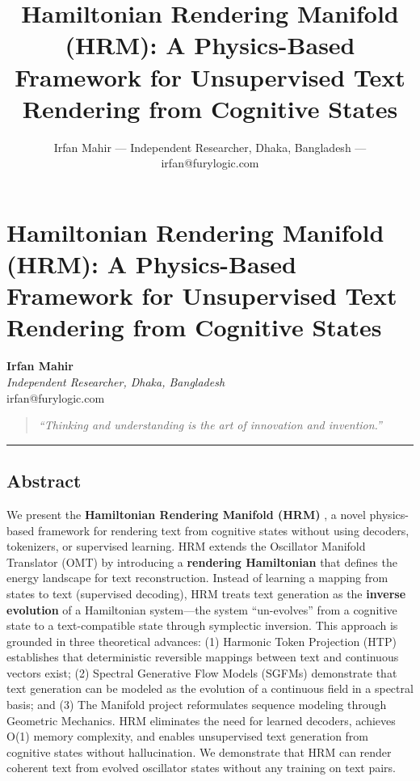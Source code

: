 \documentclass[
  11pt,
  a4paper,
]{article}
\title{Hamiltonian Rendering Manifold (HRM): A Physics-Based Framework
for Unsupervised Text Rendering from Cognitive States}
\author{Irfan Mahir --- Independent Researcher, Dhaka, Bangladesh ---
irfan@furylogic.com}
\date{}
\begin{document}
\maketitle

{
\hypersetup{linkcolor=}
\setcounter{tocdepth}{3}
\tableofcontents
}
\section{Hamiltonian Rendering Manifold (HRM): A Physics-Based Framework
for Unsupervised Text Rendering from Cognitive
States}\label{hamiltonian-rendering-manifold-hrm-a-physics-based-framework-for-unsupervised-text-rendering-from-cognitive-states}

\textbf{Irfan Mahir}\\
\emph{Independent Researcher, Dhaka, Bangladesh}\\
irfan@furylogic.com

\begin{quote}
\emph{``Thinking and understanding is the art of innovation and
invention.''}
\end{quote}

\begin{center}\rule{0.5\linewidth}{0.5pt}\end{center}

\subsection{Abstract}\label{abstract}

We present the \textbf{Hamiltonian Rendering Manifold (HRM)} , a novel
physics-based framework for rendering text from cognitive states without
using decoders, tokenizers, or supervised learning. HRM extends the
Oscillator Manifold Translator (OMT) by introducing a \textbf{rendering
Hamiltonian} that defines the energy landscape for text reconstruction.
Instead of learning a mapping from states to text (supervised decoding),
HRM treats text generation as the \textbf{inverse evolution} of a
Hamiltonian system---the system ``un-evolves'' from a cognitive state to
a text-compatible state through symplectic inversion. This approach is
grounded in three theoretical advances: (1) Harmonic Token Projection
(HTP) establishes that deterministic reversible mappings between text
and continuous vectors exist; (2) Spectral Generative Flow Models
(SGFMs) demonstrate that text generation can be modeled as the evolution
of a continuous field in a spectral basis; and (3) The Manifold project
reformulates sequence modeling through Geometric Mechanics. HRM
eliminates the need for learned decoders, achieves O(1) memory
complexity, and enables unsupervised text generation from cognitive
states without hallucination. We demonstrate that HRM can render
coherent text from evolved oscillator states without any training on
text pairs.
\end{document}
